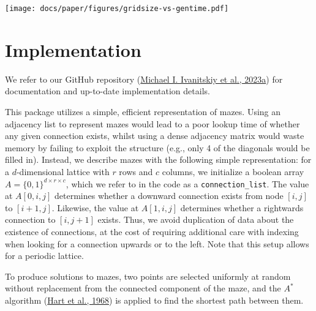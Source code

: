 \documentclass[10pt,a4paper,onecolumn]{article}
\let\origfigure\figure
\let\endorigfigure\endfigure
\renewenvironment{figure}[1][2] {
    \expandafter\origfigure\expandafter[H]
} {
    \endorigfigure
}
\begin{document}
\begin{figure}
\centering
\texttt{[image: docs/paper/figures/gridsize-vs-gentime.pdf]}
\caption{Plots of maze generation time. Generation time scales
exponentially with maze size for all algorithms (left). Generation time
does not depend on the number of mazes being generated, and there is
minimal overhead to initializing the generation process for a small
dataset (right). Wilson's algorithm is notably less efficient than
others and has high variance. Note that for both plots, values are
averaged across all parameter sets for that algorithm, and
parallelization is disabled.}
\end{figure}

\hypertarget{implementation}{%
\section{Implementation}\label{implementation}}

We refer to our GitHub repository
(\protect\hyperlink{ref-maze-dataset-github}{Michael I. Ivanitskiy et
al., 2023a}) for documentation and up-to-date implementation details.

This package utilizes a simple, efficient representation of mazes. Using
an adjacency list to represent mazes would lead to a poor lookup time of
whether any given connection exists, whilst using a dense adjacency
matrix would waste memory by failing to exploit the structure (e.g.,
only 4 of the diagonals would be filled in). Instead, we describe mazes
with the following simple representation: for a \(d\)-dimensional
lattice with \(r\) rows and \(c\) columns, we initialize a boolean array
\(A = \{0, 1\}^{d \times r \times c}\), which we refer to in the code as
a \texttt{connection\_list}. The value at \(A[0,i,j]\) determines
whether a downward connection exists from node \([i,j]\) to
\([i+1, j]\). Likewise, the value at \(A[1,i,j]\) determines whether a
rightwards connection to \([i, j+1]\) exists. Thus, we avoid duplication
of data about the existence of connections, at the cost of requiring
additional care with indexing when looking for a connection upwards or
to the left. Note that this setup allows for a periodic lattice.

To produce solutions to mazes, two points are selected uniformly at
random without replacement from the connected component of the maze, and
the \(A^*\) algorithm (\protect\hyperlink{ref-A_star}{Hart et al.,
1968}) is applied to find the shortest path between them.
\end{document}
